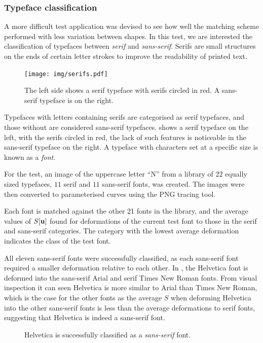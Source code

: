 \documentclass[a4paper, 12pt]{article}
\begin{document}
\subsubsection{Typeface classification \label{sec:fonts}}
A more difficult test application was devised to see how well the matching
scheme performed with less variation between shapes. In this test, we are
interested the classification of typefaces between \emph{serif} and
\emph{sans-serif}. Serifs are small structures on the ends of certain letter
strokes to improve the readability of printed text. 

\begin{figure}[h!]
  \centering
  \texttt{[image: img/serifs.pdf]}
  \caption{The left side shows a serif typeface with serifs circled in red. A
    sans-serif typeface is on the right.}
\label{fig:serif-demo}
\end{figure}

Typefaces with letters containing serifs are categorised as serif typefaces, and
those without are considered sans-serif typefaces.  shows a
serif typeface on the left, with the serifs circled in red, the lack of such
features is noticeable in the sans-serif typeface on the right. A typeface with
characters set at a specific size is known as a \emph{font}.

For the test, an image of the uppercase letter ``N'' from a library of $22$
equally sized typefaces, $11$ serif and $11$ sans-serif fonts, was created. The
images were then converted to parameterised curves using the PNG tracing tool.


Each font is matched against the other 21 fonts in the library, and the
average values of $S[\mathbf{u}]$ found for deformations of the current test font
to those in the serif and sans-serif categories. The category with the lowest
average deformation indicates the class of the test font.

All eleven sans-serif fonts were successfully classified, as each sans-serif font
required a smaller deformation relative to each other. In , the
Helvetica font is deformed into the sans-serif Arial and serif Times New Roman
fonts. From visual inspection it can seen Helvetica is more similar to Arial
than Times New Roman, which is the case for the other fonts as the average $S$
when deforming Helvetica into the other sans-serif fonts is less than the
average deformations to serif fonts, suggesting that Helvetica is indeed a
sans-serif font.

\begin{figure}[h!]
  \centering
  \caption{Helvetica is successfully classified as a \emph{sans-serif} font.}
  \label{fig:font_right}
\end{figure}
\end{document}

